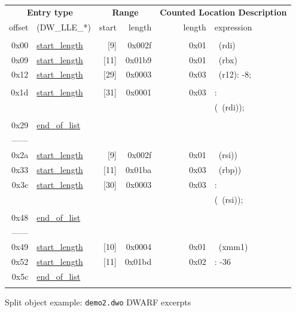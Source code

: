 \newcommand{\XXLLEsl}{\hyperlink{chap:DWLLEstartlength}{start\_length}
                      \index{DW\_LLE\_start\_length}}
\newcommand{\XXLLEeol}{\hyperlink{chap:DWLLEendoflist}{end\_of\_list}
                       \index{DW\_LLE\_end\_of\_list}}

\begin{figure}[ht]
\begin{dwflisting}
\begin{center}
\begin{tabular}{rl|rr|rl}
   \multicolumn{2}{c}{\textbf{Entry type}}
                & \multicolumn{2}{c}{\textbf{Range}} 
                                & \multicolumn{2}{l}{\hspace{6mm}\textbf{Counted Location Description}} \\
offset& (DW\_LLE\_*)   
                & start& length & length & expression \\
\hline
&&&&& \\

0x00 & \XXLLEsl &  [9] & 0x002f & 0x01 & \DWOPregfive~(rdi) \\
0x09 & \XXLLEsl & [11] & 0x01b9 & 0x01 & \DWOPregthree~(rbx) \\
0x12 & \XXLLEsl & [29] & 0x0003 & 0x03 & \DWOPbregtwelve~(r12): -8;\\
     &          &      &        &      & \DWOPstackvalue \\
0x1d & \XXLLEsl & [31] & 0x0001 & 0x03 & \DWOPentryvalue: \\
     &          &      &        &      & (\DWOPregfive~(rdi)); \\
     &          &      &        &      & \DWOPstackvalue \\
0x29 & \XXLLEeol &&&& \\
------ &&&&& \\

0x2a & \XXLLEsl &  [9] & 0x002f & 0x01 & \DWOPregfour~(rsi)) \\
0x33 & \XXLLEsl & [11] & 0x01ba & 0x03 & \DWOPregsix~(rbp)) \\
0x3c & \XXLLEsl & [30] & 0x0003 & 0x03 & \DWOPentryvalue: \\
     &          &      &        &      & (\DWOPregfour~(rsi)); \\
     &          &      &        &      & \DWOPstackvalue \\
0x48 & \XXLLEeol &&&& \\
------ &&&&& \\

0x49 & \XXLLEsl & [10] & 0x0004 & 0x01 & \DWOPregeighteen~(xmm1) \\
0x52 & \XXLLEsl & [11] & 0x01bd & 0x02 & \DWOPfbreg: -36 \\
0x5c & \XXLLEeol &&&& \\
&&&& \\
\end{tabular}
\end{center}
\end{dwflisting}
\caption{Split object example: \texttt{demo2.dwo} DWARF \dotdebugloclistsdwo{} \mbox{excerpts}}
\label{fig:splitobjectexampledemotwodwodwarfdebuglocdwoexcerpts}
\end{figure}

